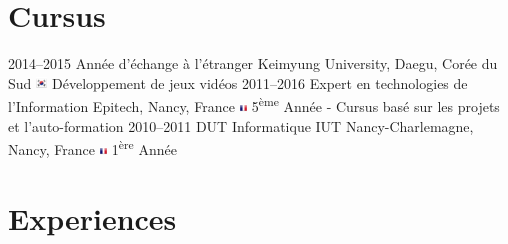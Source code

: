 \documentclass[]{friggeri-cv} %
\begin{document}
\section{Cursus}
\begin{entrylist}
\entry
{2014--2015}
{Année d'échange {\normalfont à l'étranger}}
{Keimyung University, Daegu, Corée du Sud {\includegraphics[height=0.3cm]{./flags/kr.png}}}
{Développement de jeux vidéos}
\entry
{2011--2016}
{Expert {\normalfont en technologies de l'Information}}
{Epitech, Nancy, France {\includegraphics[height=0.2cm]{./flags/fr.png}}}
{5\textsuperscript{ème} Année - Cursus basé sur les projets et l'auto-formation}
\entry
{2010--2011}
{DUT {\normalfont Informatique}}
{IUT Nancy-Charlemagne, Nancy, France {\includegraphics[height=0.2cm]{./flags/fr.png}}}
{1\textsuperscript{ère} Année}
\end{entrylist}
\section{Experiences}
\end{document}
